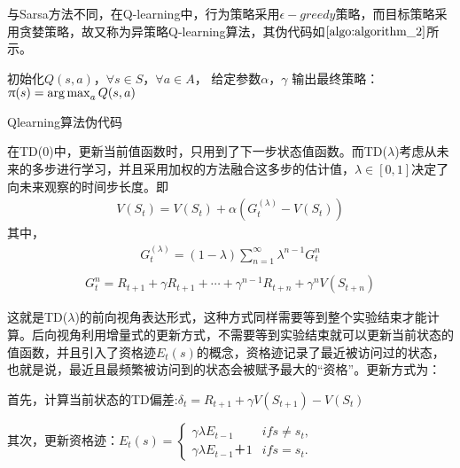 与Sarsa方法不同，在Q-learning中，行为策略采用$\epsilon-greedy$策略，而目标策略采用贪婪策略，故又称为异策略Q-learning算法，其伪代码如$\ref{algo:algorithm_2}$所示。
\begin{algorithm}[htbp]
\small
\SetAlgoLined
{} 
初始化$Q(s,a)$，$\forall s \in S$，$\forall a \in A$， 给定参数$\alpha$，$\gamma$\;
输出最终策略：$\uppi(s)=\operatorname*{arg\,max}_{a}Q(s,a)$\;
\caption{Qlearning算法伪代码}
\label{algo:algorithm_2}
\end{algorithm}

在TD(0)中，更新当前值函数时，只用到了下一步状态值函数。而TD($\lambda$)考虑从未来的多步进行学习，并且采用加权的方法融合这多步的估计值，$\lambda \in [0,1]$决定了向未来观察的时间步长度。即
\begin{equation}
\begin{aligned}
V(S_{t})=V(S_{t})+\alpha (G^{(\lambda)}_{t}-V(S_{t}))
\end{aligned}
\end{equation}
其中，
\begin{displaymath}
\begin{aligned}
G^{(\lambda)}_{t}=(1-\lambda) \sum_{n=1}^{\infty} \lambda^{n-1} G^{n}_{t}\\
\end{aligned}
\end{displaymath}
\begin{displaymath}
\begin{aligned}
G^{n}_{t}=R_{t+1}+\gamma R_{t+1}+ \cdots +\gamma^{n-1} R_{t+n}+\gamma^{n} V(S_{t+n})
\end{aligned}
\end{displaymath}

这就是TD($\lambda$)的前向视角表达形式，这种方式同样需要等到整个实验结束才能计算。后向视角利用增量式的更新方式，不需要等到实验结束就可以更新当前状态的值函数，并且引入了资格迹$E_{t}(s)$的概念，资格迹记录了最近被访问过的状态，也就是说，最近且最频繁被访问到的状态会被赋予最大的“资格”。更新方式为：

首先，计算当前状态的TD偏差:$\delta_{t}=R_{t+1}+\gamma V(S_{t+1})-V(S_{t})$

其次，更新资格迹：$E_{t}(s) = 
    \begin{cases}
        \gamma \lambda E_{t-1} & if s \neq s_{t},\\
        \gamma \lambda E_{t-1}＋1 & if s = s_{t}.
    \end{cases}$

